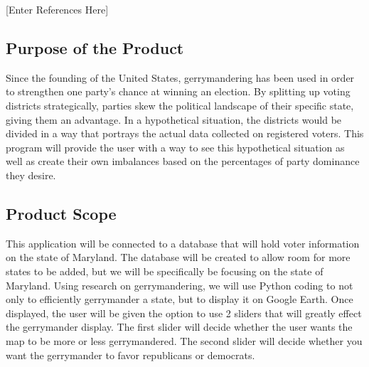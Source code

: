 \documentclass{article}
\begin{document}
\begin{addmargin}[4em]{0em}

[Enter References Here]

\end{addmargin}

\vspace{2.5mm}


\subsection{Purpose of the Product}

\vspace{2.5mm}

\begin{addmargin}[4em]{0em}

Since the founding of the United States, gerrymandering has been used in order to strengthen one party's chance at winning an election. By splitting up voting districts strategically, parties skew the political landscape of their specific state, giving them an advantage. In a hypothetical situation, the districts would be divided in a way that portrays the actual data collected on registered voters. This program will provide the user with a way to see this hypothetical situation as well as create their own imbalances based on the percentages of party dominance they desire.

\vspace{2.5mm}

\end{addmargin}


\subsection{Product Scope}

\vspace{2.5mm}

\begin{addmargin}[4em]{0em}

This application will be connected to a database that will hold voter information on the state of Maryland. The database will be created to allow room for more states to be added, but we will be specifically be focusing on the state of Maryland. Using research on gerrymandering, we will use Python coding to not only to efficiently gerrymander a state, but to display it on Google Earth. Once displayed, the user will be given the option to use 2 sliders that will greatly effect the gerrymander display. The first slider will decide whether the user wants the map to be more or less gerrymandered. The second slider will decide whether you want the gerrymander to favor republicans or democrats. 

\end{addmargin}
\end{document}
